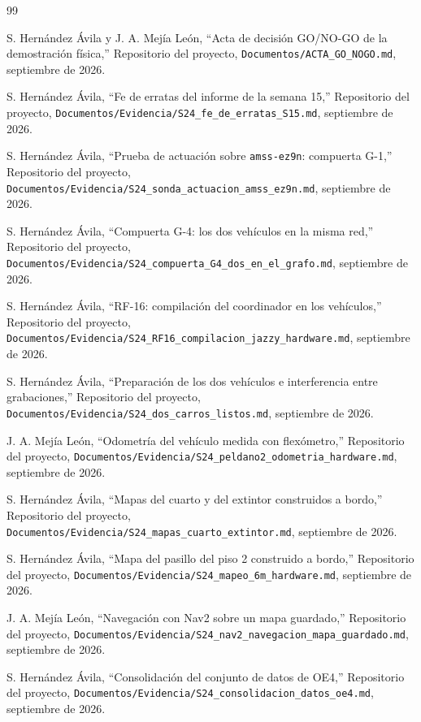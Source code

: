 \documentclass[12pt,letterpaper]{article}
\begin{document}
\begin{thebibliography}{99}

S. Hernández Ávila y J. A. Mejía León,
``Acta de decisión GO/NO-GO de la demostración física,''
Repositorio del proyecto, \texttt{Documentos/ACTA\_GO\_NOGO.md}, septiembre de 2026.

S. Hernández Ávila,
``Fe de erratas del informe de la semana 15,''
Repositorio del proyecto, \texttt{Documentos/Evidencia/S24\_fe\_de\_erratas\_S15.md}, septiembre de 2026.

S. Hernández Ávila,
``Prueba de actuación sobre \texttt{amss-ez9n}: compuerta G-1,''
Repositorio del proyecto, \texttt{Documentos/Evidencia/S24\_sonda\_actuacion\_amss\_ez9n.md}, septiembre de 2026.

S. Hernández Ávila,
``Compuerta G-4: los dos vehículos en la misma red,''
Repositorio del proyecto, \texttt{Documentos/Evidencia/S24\_compuerta\_G4\_dos\_en\_el\_grafo.md}, septiembre de 2026.

S. Hernández Ávila,
``RF-16: compilación del coordinador en los vehículos,''
Repositorio del proyecto, \texttt{Documentos/Evidencia/S24\_RF16\_compilacion\_jazzy\_hardware.md}, septiembre de 2026.

S. Hernández Ávila,
``Preparación de los dos vehículos e interferencia entre grabaciones,''
Repositorio del proyecto, \texttt{Documentos/Evidencia/S24\_dos\_carros\_listos.md}, septiembre de 2026.

J. A. Mejía León,
``Odometría del vehículo medida con flexómetro,''
Repositorio del proyecto, \texttt{Documentos/Evidencia/S24\_peldano2\_odometria\_hardware.md}, septiembre de 2026.

S. Hernández Ávila,
``Mapas del cuarto y del extintor construidos a bordo,''
Repositorio del proyecto, \texttt{Documentos/Evidencia/S24\_mapas\_cuarto\_extintor.md}, septiembre de 2026.

S. Hernández Ávila,
``Mapa del pasillo del piso 2 construido a bordo,''
Repositorio del proyecto, \texttt{Documentos/Evidencia/S24\_mapeo\_6m\_hardware.md}, septiembre de 2026.

J. A. Mejía León,
``Navegación con Nav2 sobre un mapa guardado,''
Repositorio del proyecto, \texttt{Documentos/Evidencia/S24\_nav2\_navegacion\_mapa\_guardado.md}, septiembre de 2026.

S. Hernández Ávila,
``Consolidación del conjunto de datos de OE4,''
Repositorio del proyecto, \texttt{Documentos/Evidencia/S24\_consolidacion\_datos\_oe4.md}, septiembre de 2026.


\end{thebibliography}
\end{document}
